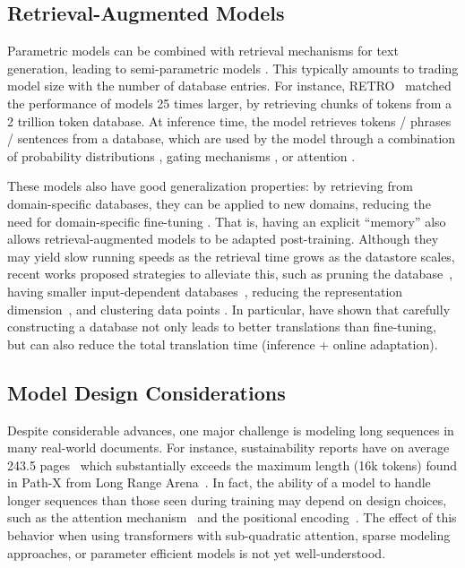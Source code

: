 \subsection{Retrieval-Augmented Models}

Parametric models can be combined with retrieval mechanisms for text generation, leading to semi-parametric models \citep{gu2018search, lewis2020retrieval,li2022survey}. This typically amounts to trading model size with the number of database entries. For instance, RETRO~\citep{borgeaud2021improving} matched the performance of models 25 times larger, by retrieving chunks of tokens from a 2 trillion token database. At inference time, the model retrieves tokens / phrases / sentences from a database, which are used by the model through a combination of probability distributions \citep{khandelwal2019generalization}, gating mechanisms \citep{yogatama2021adaptive}, or attention \citep{borgeaud2021improving}.

These models also have good generalization properties: by retrieving from domain-specific databases, they can be applied to new domains, reducing the need for domain-specific fine-tuning \citep{khandelwal2019generalization,khandelwal2020nearest}. That is, having an explicit ``memory'' also allows retrieval-augmented models to be adapted post-training. Although they may yield slow running speeds as the retrieval time grows as the datastore scales, recent works proposed strategies to alleviate this, such as pruning the database~\citep{he2021efficient}, having smaller input-dependent databases~\citep{meng2021fast}, reducing the representation dimension~\citep{martins2022efficient}, and clustering data points \citep{wang2021faster, alon2022neuro}. In particular, \citet{martins2022chunk} have shown that carefully constructing a database not only leads to better translations than fine-tuning, but can also reduce the total translation time (inference + online adaptation).

\subsection{Model Design Considerations} Despite considerable advances, one major challenge is modeling long sequences in many real-world documents. For instance, sustainability reports have on average 243.5 pages~\citep{manes2018ensuring} which substantially exceeds the maximum length (16k tokens) found in Path-X from Long Range Arena~\citep{tay2021long}. In fact, the ability of a model to handle longer sequences than those seen during training may depend on design choices, such as the attention mechanism~\citep{dubois-etal-2020-location} and the positional encoding~\citep{shaw-etal-2018-self,press2022train}. The effect of this behavior when using transformers with sub-quadratic attention, sparse modeling approaches, or parameter efficient models is not yet well-understood.

